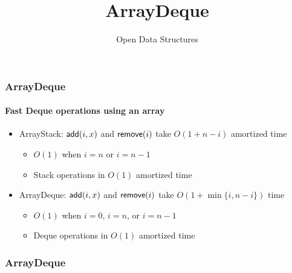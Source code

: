 \documentclass[aspectratio=169,xcolor=dvipsnames]{beamer}
\title{ArrayDeque}
\author{Open Data Structures}
\begin{document}
\begin{frame}
  \titlepage
\end{frame}

\begin{frame}
  \frametitle{ArrayDeque}
  \framesubtitle{Fast Deque operations using an array}

  \begin{itemize}
    \item<+-> ArrayStack: $\mathsf{add}(i,x)$ and $\mathsf{remove}(i)$ take $O(1+n-i)$ amortized time
    \begin{itemize}
      \item<+-> $O(1)$ when $i=n$ or $i=n-1$
      \item<+-> Stack operations in $O(1)$ amortized time
    \end{itemize}
    \item<+-> ArrayDeque: $\mathsf{add}(i,x)$ and $\mathsf{remove}(i)$ take $O(1+\min\{i,n-i\})$ time
    \begin{itemize}
      \item<+-> $O(1)$ when $i=0$, $i=n$, or $i=n-1$
      \item<+-> Deque operations in $O(1)$ amortized time
    \end{itemize}
  \end{itemize}
\end{frame}


\begin{frame}
  \frametitle{ArrayDeque}

  \begin{center}
  \end{center}
\end{frame}
\end{document}
